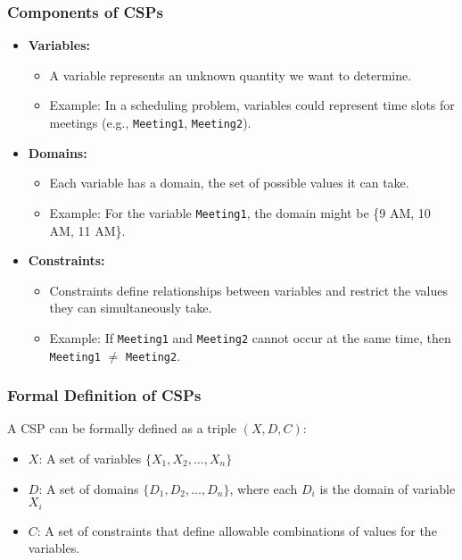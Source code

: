 \documentclass[aspectratio=169]{beamer}
\begin{document}
\begin{frame}[fragile]
    \frametitle{Components of CSPs}
    \begin{itemize}
        \item \textbf{Variables:} 
        \begin{itemize}
            \item A variable represents an unknown quantity we want to determine.
            \item Example: In a scheduling problem, variables could represent time slots for meetings (e.g., \texttt{Meeting1}, \texttt{Meeting2}).
        \end{itemize}
        
        \item \textbf{Domains:} 
        \begin{itemize}
            \item Each variable has a domain, the set of possible values it can take.
            \item Example: For the variable \texttt{Meeting1}, the domain might be \{9 AM, 10 AM, 11 AM\}.
        \end{itemize}
        
        \item \textbf{Constraints:} 
        \begin{itemize}
            \item Constraints define relationships between variables and restrict the values they can simultaneously take.
            \item Example: If \texttt{Meeting1} and \texttt{Meeting2} cannot occur at the same time, then \texttt{Meeting1} $\neq$ \texttt{Meeting2}.
        \end{itemize}
    \end{itemize}
\end{frame}

\begin{frame}[fragile]
    \frametitle{Formal Definition of CSPs}
    A CSP can be formally defined as a triple \((X, D, C)\):
    \begin{itemize}
        \item \(X\): A set of variables \(\{X_1, X_2, \ldots, X_n\}\)
        \item \(D\): A set of domains \(\{D_1, D_2, \ldots, D_n\}\), where each \(D_i\) is the domain of variable \(X_i\)
        \item \(C\): A set of constraints that define allowable combinations of values for the variables.
    \end{itemize}
\end{frame}
\end{document}
